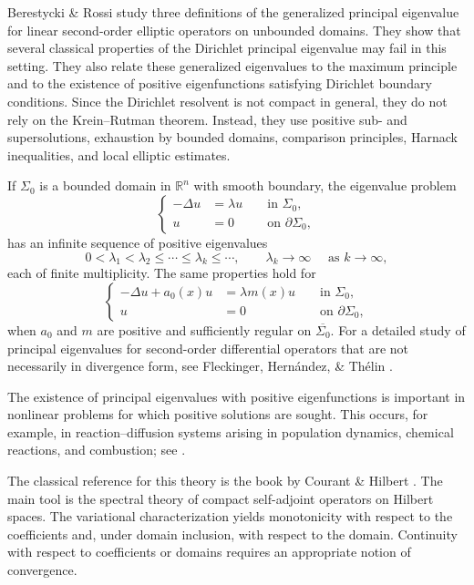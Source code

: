 \documentclass[reqno, 11pt, a4paper]{amsart}
\numberwithin{equation}{section}
\begin{document}
Berestycki \& Rossi \cite{zbMATH06441399} study three definitions of the generalized principal eigenvalue for linear second-order elliptic operators on unbounded domains. They show that several classical properties of the Dirichlet principal eigenvalue may fail in this setting. They also relate these generalized eigenvalues to the maximum principle and to the existence of positive eigenfunctions satisfying Dirichlet boundary conditions. Since the Dirichlet resolvent is not compact in general, they do not rely on the Krein--Rutman theorem. Instead, they use positive sub- and supersolutions, exhaustion by bounded domains, comparison principles, Harnack inequalities, and local elliptic estimates.



If $\Sigma_0$ is a bounded domain in $\mathbb R^n$ with smooth boundary, the eigenvalue problem
$$
\left\{
\begin{aligned}
-\Delta u &=\lambda u & & \text { in } \Sigma_0,\\
u &=0 & & \text { on } \partial\Sigma_0,
\end{aligned}
\right.
$$
has an infinite sequence of positive eigenvalues
$$
0<\lambda_1<\lambda_2\leq\cdots\leq\lambda_k\leq\cdots,\qquad \lambda_k\rightarrow\infty \quad\text { as } k\rightarrow\infty,
$$
each of finite multiplicity. The same properties hold for
$$
\left\{
\begin{aligned}
-\Delta u+a_0(x)u &=\lambda m(x)u & & \text { in } \Sigma_0,\\
u &=0 & & \text { on } \partial\Sigma_0,
\end{aligned}
\right.
$$
when $a_0$ and $m$ are positive and sufficiently regular on $\overline{\Sigma_0}$. For a detailed study of principal eigenvalues for second-order differential operators that are not necessarily in divergence form, see Fleckinger, Hernández, \& Thélin \cite{fleckinger2004existence}.

The existence of principal eigenvalues with positive eigenfunctions is important in nonlinear problems for which positive solutions are sought. This occurs, for example, in reaction--diffusion systems arising in population dynamics, chemical reactions, and combustion; see \cite{smoller2012shock}.

The classical reference for this theory is the book by Courant \& Hilbert \cite{courant1962methods}. The main tool is the spectral theory of compact self-adjoint operators on Hilbert spaces. { The variational characterization yields monotonicity with respect to the coefficients and, under domain inclusion, with respect to the domain. Continuity with respect to coefficients or domains requires an appropriate notion of convergence.}
\end{document}
